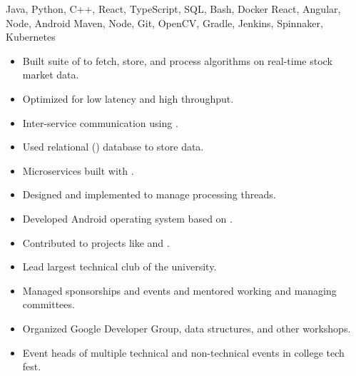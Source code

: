  Java, Python, C++, React, TypeScript, SQL, Bash, Docker\newline
{} React, Angular, Node, Android\newline
{} Maven, Node, Git, OpenCV, Gradle, Jenkins, Spinnaker, Kubernetes\newline


\begin{itemize}
  \item Built  suite of  to fetch, store, and process algorithms on real-time stock market data.
  \item Optimized for low latency and high throughput.
  \item Inter-service communication using .
  \item Used relational () database to store data.
  \item Microservices built with .
  \item Designed and implemented  to manage processing threads.
 \end{itemize}

\begin{itemize}
  \item Developed Android operating system based on .
  \item Contributed to  projects like  and .
 \end{itemize}


\begin{itemize}
    \item Lead largest technical club of the university.
    \item Managed sponsorships and events and mentored working and managing committees.
    \item Organized Google Developer Group, data structures, and other workshops.
 \end{itemize}
\begin{itemize}
    \item Event heads of multiple technical and non-technical events in college tech fest.
 \end{itemize}


